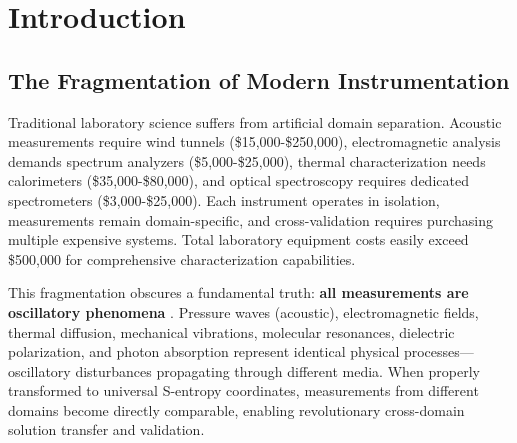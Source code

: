 \documentclass[12pt,a4paper]{article}
\begin{document}
\begin{abstract}
Mathematical analysis establishes the Transcendent Observer Theorem: measurements existing as transient disturbances in unified S-entropy space enable domain-independent solution navigation, eliminating boundaries between acoustic, electrical, thermal, mechanical, and optical domains. Integration with trans-Planckian timing and St-Stellas coordinate transformations enables fluid-circuit-structure equivalence, where airflow patterns, electromagnetic currents, and mechanical vibrations represent identical oscillatory phenomena in different observation frames. The framework establishes consumer computer hardware as a complete precision laboratory when properly synchronized and analyzed through unified S-entropy coordinates, democratizing scientific instrumentation while enabling cross-domain insights impossible with conventional single-purpose equipment.

\textbf{Keywords:} unified laboratory instrumentation, S-entropy measurement validation, dual-pathway analysis, cross-domain equivalence, harmonic network graphs, computer vision metrology, zero-cost precision instruments, transcendent observer framework
\end{abstract}

\section{Introduction}

\subsection{The Fragmentation of Modern Instrumentation}

Traditional laboratory science suffers from artificial domain separation. Acoustic measurements require wind tunnels (\$15,000-\$250,000), electromagnetic analysis demands spectrum analyzers (\$5,000-\$25,000), thermal characterization needs calorimeters (\$35,000-\$80,000), and optical spectroscopy requires dedicated spectrometers (\$3,000-\$25,000). Each instrument operates in isolation, measurements remain domain-specific, and cross-validation requires purchasing multiple expensive systems. Total laboratory equipment costs easily exceed \$500,000 for comprehensive characterization capabilities.

This fragmentation obscures a fundamental truth: \textbf{all measurements are oscillatory phenomena} \cite{sachikonye2024physical_necessity}. Pressure waves (acoustic), electromagnetic fields, thermal diffusion, mechanical vibrations, molecular resonances, dielectric polarization, and photon absorption represent identical physical processes—oscillatory disturbances propagating through different media. When properly transformed to universal S-entropy coordinates, measurements from different domains become directly comparable, enabling revolutionary cross-domain solution transfer and validation.
\end{document}
